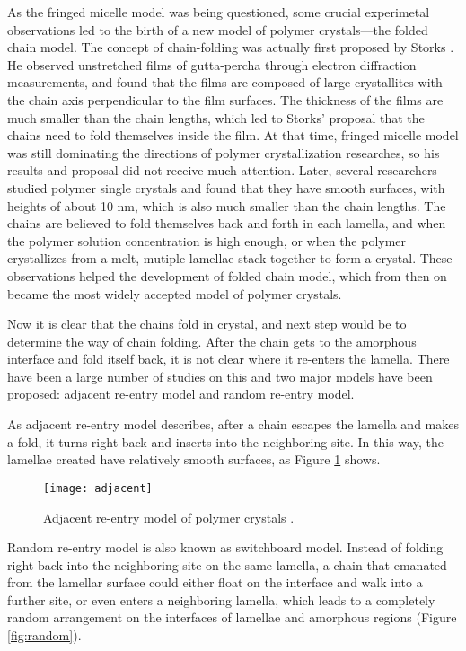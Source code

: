 As the fringed micelle model was being questioned, some crucial experimetal observations led to the birth of a new model of polymer crystals---the folded chain model. The concept of chain-folding was actually first proposed by Storks \cite{Storks1938}. He observed unstretched films of gutta-percha through electron diffraction measurements, and found that the films are composed of large crystallites with the chain axis perpendicular to the film surfaces. The thickness of the films are much smaller than the chain lengths, which led to Storks' proposal that the chains need to fold themselves inside the film.  At that time, fringed micelle model was still dominating the directions of polymer crystallization researches, so his results and proposal did not receive much attention. Later, several researchers \cite{JACCODINE1955,Till1957,Keller1957} studied polymer single crystals and found that they have smooth surfaces, with heights of about 10 nm, which is also much smaller than the chain lengths. The chains are believed to fold themselves back and forth in each lamella, and when the polymer solution concentration is high enough, or when the polymer crystallizes from a melt, mutiple lamellae stack together to form a crystal. These observations helped the development of folded chain model, which from then on became the most widely accepted model of polymer crystals. 

Now it is clear that the chains fold in crystal, and next step would be to determine the way of chain folding. After the chain gets to the amorphous interface and fold itself back, it is not clear where it re-enters the lamella. There have been a large number of studies on this \cite{Kovacs1975,Yoon1979,Keller1979} and two major models have been proposed: adjacent re-entry model and random re-entry model.

As adjacent re-entry model describes, after a chain escapes the lamella and makes a fold, it turns right back and inserts into the neighboring site. In this way, the lamellae created have relatively smooth surfaces, as Figure \ref{fig:adjacent} shows.

\begin{figure}[H]
\center
\vspace{1 cm}
\texttt{[image: adjacent]}
\caption[Adjacent re-entry model of polymer crystals.]{Adjacent re-entry model of polymer crystals \cite{High}.}
\label{fig:adjacent}
\end{figure}

Random re-entry model is also known as switchboard model. Instead of folding right back into the neighboring site on the same lamella, a chain that emanated from the lamellar surface could either float on the interface and walk into a further site, or even enters a neighboring lamella, which leads to a completely random arrangement on the interfaces of lamellae and amorphous regions (Figure \ref{fig:random}).

